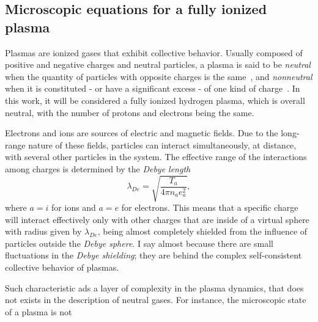 \documentclass[12pt,a4paper,ruledheader]{report}
\begin{document}
\begin{appendix}

\chapter{Microscopic equations for a fully ionized plasma}
\label{appF}
Plasmas are ionized gases that exhibit collective behavior. Usually composed
of positive and negative charges and neutral particles, a plasma is said to
be \emph{neutral} when the quantity of particles with opposite charges is the
same~\cite{klimo}, and \emph{nonneutral} when it is constituted - or have a
significant excess - of one kind of charge~\cite{DavidsonNonNeutral}. In this
work, it will be considered a fully ionized hydrogen plasma, which is overall
neutral, with the number of protons and electrons being the same.

Electrons and ions are sources of electric and magnetic fields. Due to the
long-range nature of these fields, particles can interact simultaneously, at
distance, with several other particles in the system. The effective range of
the interactions among charges is determined by the \emph{Debye length}
\begin{equation}
  \label{debye}
  \lambda_{De}=\sqrt{\frac{T_a}{4\pi n_a e_a^2}},
\end{equation}
where $a=i$ for ions and $a=e$ for electrons. This means that a specific charge
will interact effectively only with other charges that are inside of a virtual
sphere with radius given by $\lambda_{De}$, being almost completely shielded
from the influence of particles outside the \emph{Debye sphere}. I say almost
because there are small fluctuations in the \emph{Debye shielding}; they are
behind the complex self-consistent collective behavior of plasmas.

Such characteristic ads a layer of complexity in the plasma dynamics, that does
not exists in the description of neutral gases. For instance, the microscopic
state of a plasma is not 




\end{appendix}




\end{document}
